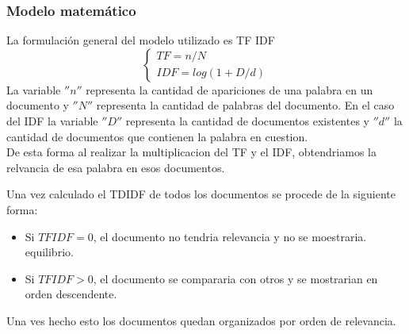 \documentclass{beamer}
\begin{document}
\begin{frame}
\frametitle{Modelo matemático}
\begin{minipage}{10cm}
	La formulación general del modelo utilizado es TF IDF \\
	\begin{equation}\label{eq:general}
			\begin{cases}
			TF = n/N   \\
			IDF = log(1+D/d)
			\end{cases}
	\end{equation} 
	La variable $''n''$ representa la cantidad de apariciones de una palabra en un documento y $''N''$ representa la cantidad de palabras del documento. En el caso del IDF la variable $''D''$ representa la cantidad de documentos existentes y $''d''$ la cantidad de documentos que contienen la palabra en cuestion. \\
	De esta forma al realizar la multiplicacion del TF y el IDF, obtendriamos la relvancia de esa palabra en esos documentos.
\end{minipage}
\end{frame}	

\begin{frame}
	\begin{minipage}{10 cm}
		Una vez calculado el TDIDF de todos los documentos se procede de la siguiente forma:
		\begin{itemize}
			\item Si $TFIDF=0$, el documento no tendria relevancia y no se moestraria.
			equilibrio.
			\item Si $TFIDF > 0$, el documento se compararia con otros y se mostrarian en orden descendente.
		\end{itemize}
	Una ves hecho esto los documentos quedan organizados por orden de relevancia.
	\end{minipage}
\end{frame}
\end{document}
